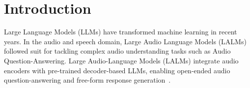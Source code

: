 \documentclass{Interspeech}
\begin{document}

\newcommand{\cem}[1]{ {\color{red} $\mathcal C$ #1 }}

\label{sec:intro}






\section{Introduction}

Large Language Models (LLMs) have transformed machine learning in recent years. In the audio and speech domain, Large Audio Language Models (LALMs) followed suit for tackling complex audio understanding tasks such as Audio Question-Answering. Large Audio-Language Models (LALMs) integrate audio encoders with pre-trained decoder-based LLMs, enabling open-ended audio question-answering and free-form response generation~\cite{aroralandscape,xu2025qwen3,Qwen2.5-Omni,goel2025audioflamingo3advancing,wu2025step}. 

%     
\end{document}
